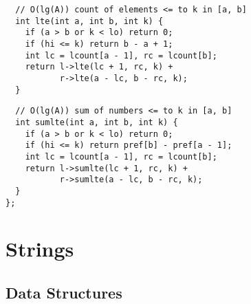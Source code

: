 \documentclass[twoside]{article}
\begin{document}
\begin{multicols*}{2}
\begin{verbatim}
  // O(lg(A)) count of elements <= to k in [a, b]
  int lte(int a, int b, int k) {
    if (a > b or k < lo) return 0;
    if (hi <= k) return b - a + 1;
    int lc = lcount[a - 1], rc = lcount[b];
    return l->lte(lc + 1, rc, k) +
           r->lte(a - lc, b - rc, k);
  }
\end{verbatim}
\vspace{-12pt}
\begin{verbatim}
  // O(lg(A)) sum of numbers <= to k in [a, b]
  int sumlte(int a, int b, int k) {
    if (a > b or k < lo) return 0;
    if (hi <= k) return pref[b] - pref[a - 1];
    int lc = lcount[a - 1], rc = lcount[b];
    return l->sumlte(lc + 1, rc, k) +
           r->sumlte(a - lc, b - rc, k);
  }
};
\end{verbatim}

\sectionfont{\bfseries\sffamily\centering\Huge}
\vspace{1em}
\section*{Strings}
\vspace{3em}
\subsectionfont{\bfseries\sffamily\centering\LARGE}
\vspace{0em}
\subsection*{Data Structures}
\vspace{2em}
\subsubsectionfont{\large\bfseries\sffamily\underline}

\end{multicols*}
\end{document}
